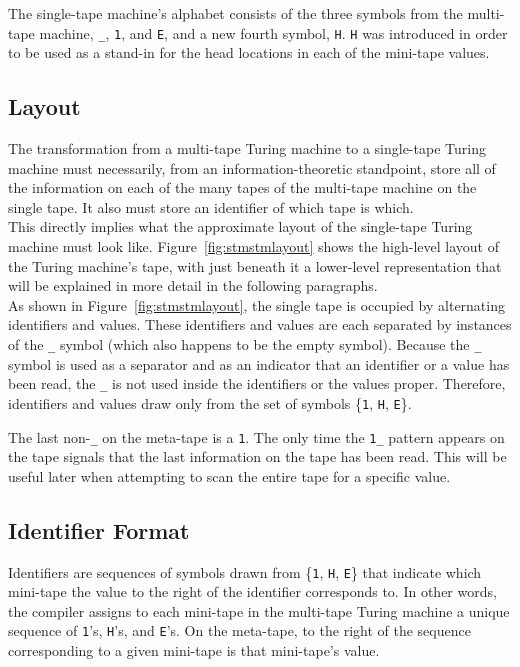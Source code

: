\documentclass{report}
\begin{document}
The single-tape machine's alphabet consists of the three symbols from the multi-tape machine, \texttt{\_}, \texttt{1}, and \texttt{E}, and a new fourth symbol, \texttt{H}. \texttt{H} was introduced in order to be used as a stand-in for the head locations in each of the mini-tape values.

\subsection{Layout}

The transformation from a multi-tape Turing machine to a single-tape Turing machine must necessarily, from an information-theoretic standpoint, store all of the information on each of the many tapes of the multi-tape machine on the single tape. It also must store an identifier of which tape is which. \\

This directly implies what the approximate layout of the single-tape Turing machine must look like. Figure~\ref{fig:stmstmlayout} shows the high-level layout of the Turing machine's tape, with just beneath it a lower-level representation that will be explained in more detail in the following paragraphs. \\

As shown in Figure~\ref{fig:stmstmlayout}, the single tape is occupied by alternating identifiers and values. These identifiers and values are each separated by instances of the \texttt{\_} symbol (which also happens to be the empty symbol). Because the \texttt{\_} symbol is used as a separator and as an indicator that an identifier or a value has been read, the \texttt{\_} is not used inside the identifiers or the values proper. Therefore, identifiers and values draw only from the set of symbols \{\texttt{1}, \texttt{H}, \texttt{E}\}.

The last non-\texttt{\_} on the meta-tape is a \texttt{1}. The only time the \texttt{1\_} pattern appears on the tape signals that the last information on the tape has been read. This will be useful later when attempting to scan the entire tape for a specific value.

\subsection{Identifier Format}

Identifiers are sequences of symbols drawn from \{\texttt{1}, \texttt{H}, \texttt{E}\} that indicate which mini-tape the value to the right of the identifier corresponds to. In other words, the compiler assigns to each mini-tape in the multi-tape Turing machine a unique sequence of \texttt{1}'s, \texttt{H}'s, and \texttt{E}'s. On the meta-tape, to the right of the sequence corresponding to a given mini-tape is that mini-tape's value. \\
\end{document}
